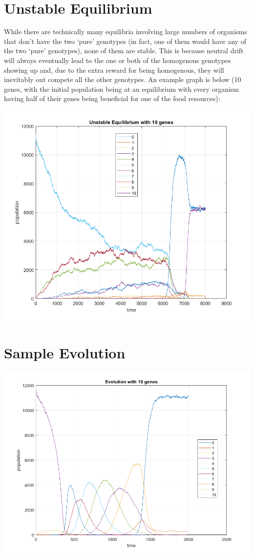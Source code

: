 \documentclass[11pt]{article}
\begin{document}
\section*{Unstable Equilibrium}

	While there are technically many equilibria involving large numbers of organisms that don't have the two `pure' genotypes (in fact, one of them would have any of the two `pure' genotypes), none of them are stable. This is because neutral drift will always eventually lead to the one or both of the homogenous genotypes showing up and, due to the extra reward for being homogenous, they will inevitably out compete all the other genotypes. An example graph is below (10 genes, with the initial population being at an equilibrium with every organism having half of their genes being beneficial for one of the food resources): 
	
	\includegraphics[scale = .8]{unstable_equil}

\section*{Sample Evolution}

	\includegraphics[scale = .8]{evolution_ex}
\end{document}
